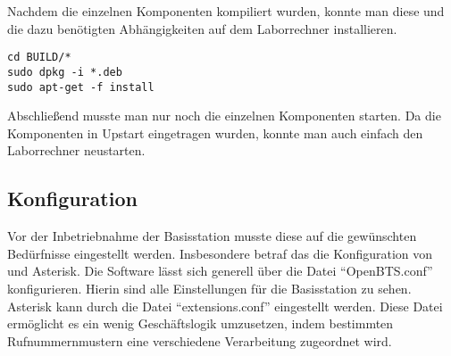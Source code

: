 Nachdem die einzelnen Komponenten kompiliert wurden, konnte man diese und die dazu benötigten Abhängigkeiten auf dem Laborrechner installieren.

\begin{lstlisting}
cd BUILD/*
sudo dpkg -i *.deb
sudo apt-get -f install
\end{lstlisting}

Abschließend musste man nur noch die einzelnen Komponenten starten. Da die Komponenten in Upstart eingetragen wurden, konnte man auch einfach den Laborrechner neustarten.

\subsection{Konfiguration}
\label{sec:konfiguration}
Vor der Inbetriebnahme der Basisstation musste diese auf die gewünschten Bedürfnisse eingestellt werden. Insbesondere betraf das die Konfiguration von \OpenBTS und Asterisk. Die Software \OpenBTS lässt sich generell über die Datei ``OpenBTS.conf'' konfigurieren. Hierin sind alle Einstellungen für die Basisstation zu sehen. Asterisk kann durch die Datei ``extensions.conf'' eingestellt werden. Diese Datei ermöglicht es ein wenig Geschäftslogik umzusetzen, indem bestimmten Rufnummernmustern eine verschiedene Verarbeitung zugeordnet wird. \\

